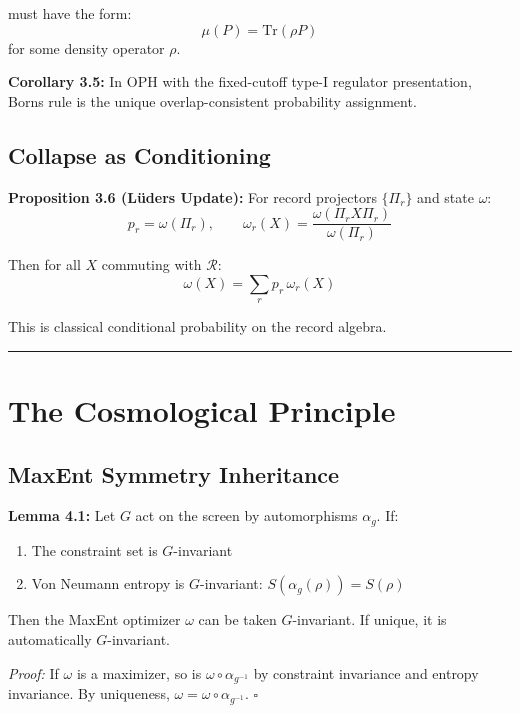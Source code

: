 must have the form: \[\mu(P) = \text{Tr}(\rho P)\] for some density operator \(\rho\).

\textbf{Corollary 3.5:} In OPH with the fixed-cutoff type-I regulator presentation, Born\textquotesingle s rule is the unique overlap-consistent probability assignment.

\subsection{Collapse as Conditioning}\label{36-collapse-as-conditioning}

\textbf{Proposition 3.6 (L\"{u}ders Update):} For record projectors \(\{\Pi_r\}\) and state \(\omega\): \[p_r = \omega(\Pi_r), \qquad \omega_r(X) = \frac{\omega(\Pi_r X \Pi_r)}{\omega(\Pi_r)}\]

Then for all \(X\) commuting with \(\mathcal{R}\): \[\omega(X) = \sum_r p_r \, \omega_r(X)\]

This is classical conditional probability on the record algebra.

\begin{center}\rule{0.5\linewidth}{0.5pt}\end{center}

\section{The Cosmological Principle}\label{4-the-cosmological-principle}

\subsection{MaxEnt Symmetry Inheritance}\label{41-maxent-symmetry-inheritance}

\textbf{Lemma 4.1:} Let \(G\) act on the screen by automorphisms \(\alpha_g\). If:

\begin{enumerate}
\def\labelenumi{\arabic{enumi}.}
\tightlist
\item
 The constraint set is \(G\)-invariant
\item
 Von Neumann entropy is \(G\)-invariant: \(S(\alpha_g(\rho)) = S(\rho)\)
\end{enumerate}

Then the MaxEnt optimizer \(\omega\) can be taken \(G\)-invariant. If unique, it is automatically \(G\)-invariant.

\emph{Proof:} If \(\omega\) is a maximizer, so is \(\omega \circ \alpha_{g^{-1}}\) by constraint invariance and entropy invariance. By uniqueness, \(\omega = \omega \circ \alpha_{g^{-1}}\). \(\square\)

